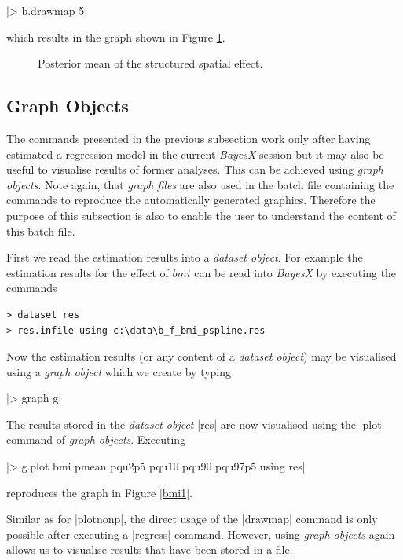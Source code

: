 \documentclass[a4paper]{article}
\begin{document}
|> b.drawmap 5|

which results in the graph shown in Figure \ref{spat1}.

\begin{figure}[ht]
\begin{center}
{\it\caption{Posterior mean of the structured spatial
effect.\label{spat1}}}
\end{center}
\end{figure}

\subsection{Graph Objects}

The commands presented in the previous subsection work only after
having estimated a regression model in the current {\em BayesX}
session but it may also be useful to visualise results of former
analyses. This can be achieved using {\em graph objects}. Note
again, that {\em graph files} are also used in the batch file
containing the commands to reproduce the automatically generated
graphics. Therefore the purpose of this subsection is also to enable
the user to understand the content of this batch file.

First we read the estimation results into a {\it dataset object}.
For example the estimation results for the effect of $bmi$ can be
read into {\it BayesX} by executing the commands

\begin{verbatim}
> dataset res
> res.infile using c:\data\b_f_bmi_pspline.res
\end{verbatim}

Now the estimation results (or any content of a {\it dataset
object}) may be visualised using a {\it graph object} which we
create by typing

|> graph g|

The results stored in the {\em dataset object} |res| are now visualised using the |plot| command of {\it graph objects}.
Executing

|> g.plot bmi pmean pqu2p5 pqu10 pqu90 pqu97p5 using res|

reproduces the graph in Figure \ref{bmi1}.

Similar as for |plotnonp|, the direct usage of the |drawmap| command is only possible after executing a |regress| command.
However, using {\it graph objects} again allows us to visualise results that have been stored in a file.
\end{document}
